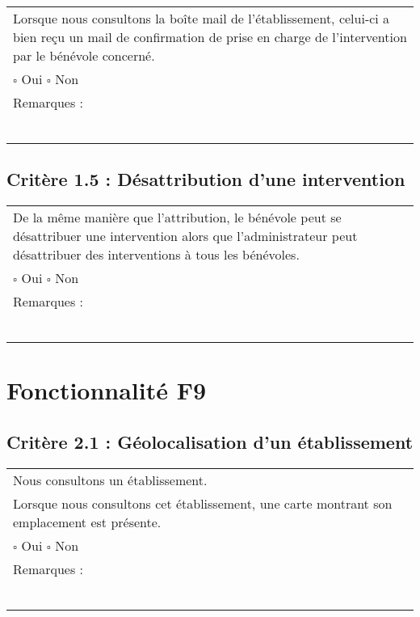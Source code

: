 		\begin{center}
    	 		\begin{tabular}[h]{|p{}|}
			\hline
				Lorsque nous consultons la boîte mail de l’établissement, celui-ci a bien reçu un mail de confirmation de prise en charge de l’intervention par le bénévole concerné. \\
				
				$\square$ Oui \hfill \hfill $\square$ Non \\\hline Remarques : \\ ~\\
			 \\\hline
     		\end{tabular}
  		\end{center}	

	\subsection*{Critère 1.5 : Désattribution d’une intervention}
	
		\begin{center}
    	 		\begin{tabular}[h]{|p{}|}
			\hline
				De la même manière que l’attribution, le bénévole peut se désattribuer une intervention alors que l’administrateur peut désattribuer des interventions à tous les bénévoles. \\
				
				$\square$ Oui \hfill \hfill $\square$ Non \\\hline Remarques : \\ ~\\
			 \\\hline
     		\end{tabular}
  		\end{center}	
  		
  		
\section{Fonctionnalité F9}
  		
  	\subsection*{Critère 2.1 : Géolocalisation d'un établissement}
  		\begin{center}
    	 		\begin{tabular}[h]{|p{}|}
			\hline
				Nous consultons un établissement. \\
				Lorsque nous consultons cet établissement, une carte montrant son emplacement est présente. \\
						
				$\square$ Oui  \hfill \hfill $\square$ Non \\\hline Remarques : \\ ~\\
			 \\\hline
     		\end{tabular}
  		\end{center}	
  		
